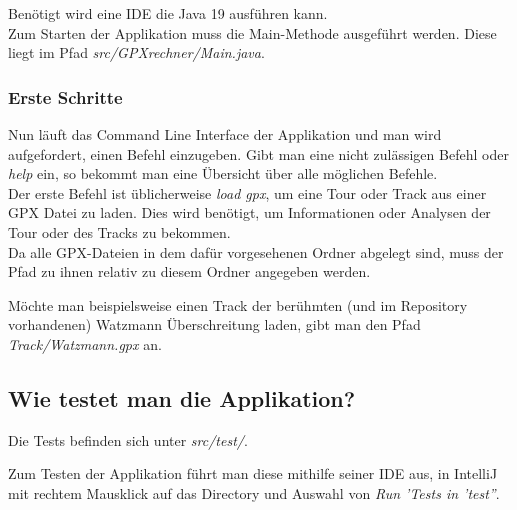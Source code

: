 Benötigt wird eine IDE die Java 19 ausführen kann.\\

Zum Starten der Applikation muss die Main-Methode ausgeführt werden. 
Diese liegt im Pfad \textit{src/GPXrechner/Main.java}.

\subsubsection{Erste Schritte}

Nun läuft das Command Line Interface der Applikation und man wird aufgefordert, einen Befehl einzugeben.
 Gibt man eine nicht zulässigen Befehl oder \textit{help} ein, so bekommt man eine Übersicht über alle möglichen Befehle.\\
 
Der erste Befehl ist üblicherweise \textit{load gpx}, um eine Tour oder Track aus einer GPX Datei zu laden. Dies wird benötigt, um Informationen oder Analysen der Tour oder des Tracks zu bekommen.
\\

Da alle GPX-Dateien in dem dafür vorgesehenen Ordner abgelegt sind, muss der Pfad zu ihnen relativ zu diesem Ordner angegeben werden.

Möchte man beispielsweise einen Track der berühmten (und im Repository vorhandenen) Watzmann Überschreitung laden, gibt man den Pfad \textit{Track/Watzmann.gpx} an.

\subsection{Wie testet man die Applikation?}

Die Tests befinden sich unter \textit{src/test/}.

Zum Testen der Applikation führt man diese mithilfe seiner IDE aus, in IntelliJ mit rechtem Mausklick auf das Directory und Auswahl von \textit{Run 'Tests in 'test''}.